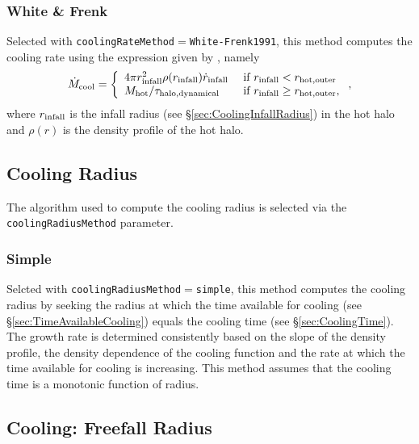 \subsubsection{White \& Frenk}

Selected with {\tt coolingRateMethod}$=${\tt White-Frenk1991}, this method computes the cooling rate using the expression given by \cite{white_galaxy_1991}, namely
\begin{equation}
\dot{M}_{\rm cool} = \left\{ \begin{array}{ll} 4 \pi r_{\rm infall}^2 \rho(r_{\rm infall}) \dot{r}_{\rm infall}& \hbox{ if } r_{\rm infall} < r_{\rm hot, outer} \\ M_{\rm hot}/\tau_{\rm halo, dynamical} & \hbox{ if } r_{\rm infall} \ge r_{\rm hot, outer}, \end{array} \right. ,
\end{equation}
where $r_{\rm infall}$ is the infall radius (see \S\ref{sec:CoolingInfallRadius}) in the hot halo and $\rho(r)$ is the density profile of the hot halo.

\subsection{Cooling Radius}\label{sec:CoolingRadius}

The algorithm used to compute the cooling radius is selected via the {\tt coolingRadiusMethod} parameter.

\subsubsection{Simple}

Selcted with {\tt coolingRadiusMethod}$=${\tt simple}, this method computes the cooling radius by seeking the radius at which the time available for cooling (see \S\ref{sec:TimeAvailableCooling}) equals the cooling time (see \S\ref{sec:CoolingTime}). The growth rate is determined consistently based on the slope of the density profile, the density dependence of the cooling function and the rate at which the time available for cooling is increasing. This method assumes that the cooling time is a monotonic function of radius.

\subsection{Cooling: Freefall Radius}\label{sec:CoolingFreefallRadius}

